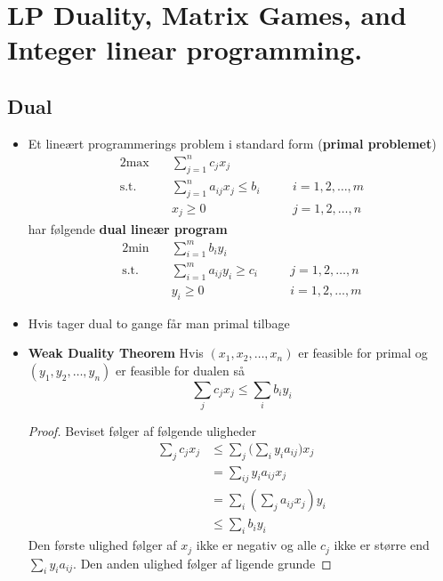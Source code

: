 \section{LP Duality, Matrix Games, and Integer linear programming.}
\subsection{Dual}
\begin{itemize}
	\item Et lineært programmerings problem i standard form (\textbf{primal problemet})
  \begin{alignat*}{2}
    \text{max} \quad  & \sum_{j=1}^n c_jx_j && \\
    \text{s.t.} \quad & \sum_{j=1}^n a_{ij}x_j \leq b_i && \quad i = 1,2,\dots,m \\
    & x_j \geq 0 && \quad j = 1,2, \dots, n
  \end{alignat*}
  har følgende \textbf{dual lineær program}
  \begin{alignat*}{2}
    \text{min} \quad  & \sum_{i=1}^m b_iy_i && \\
    \text{s.t.} \quad & \sum_{i=1}^m a_{ij}y_i \geq c_i && \quad j = 1,2,\dots,n \\
    & y_i \geq 0 && \quad i = 1,2, \dots, m
  \end{alignat*}
  \item Hvis tager dual to gange får man primal tilbage
  \item \textbf{Weak Duality Theorem}  Hvis $(x_1, x_2, \dots, x_n)$ er feasible for primal og $(y_1, y_2, \dots, y_n)$ er feasible for dualen så
  \begin{equation*}
    \sum_j c_jx_j \leq \sum_i b_iy_i 
  \end{equation*}
  \begin{proof} 
    Beviset følger af følgende uligheder 
    \begin{align*}
      \sum_j c_jx_j &\leq \sum_j \bigg(\sum_i y_i a_{ij}\bigg) x_j \\
                   &= \sum_{ij} y_ia_{ij} x_j \\
                   &= \sum_i (\sum_j a_{ij} x_j) y_i \\
                   &\leq \sum_i b_i y_i
    \end{align*}
    Den første ulighed følger af $x_j$ ikke er negativ og alle $c_j$ ikke er større end $\sum_i y_ia_{ij}$. Den anden ulighed følger af ligende grunde

  \end{proof}
\end{itemize}

